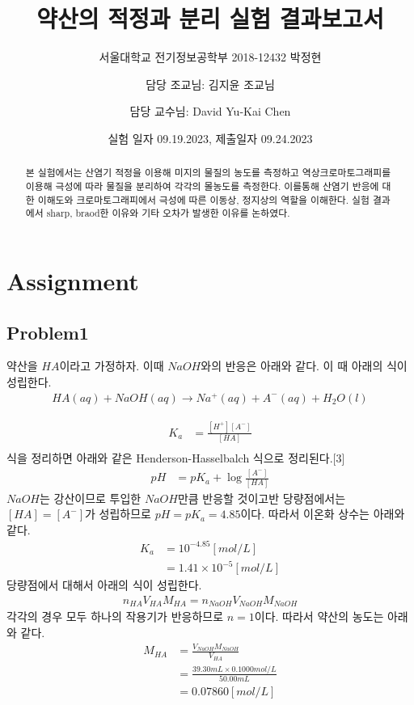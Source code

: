 \documentclass[%
 reprint,
 amsmath,amssymb,
 aps,
]{revtex4-2}
\begin{document}
\title{약산의 적정과 분리 실험 결과보고서}

\author{서울대학교 전기정보공학부 2018-12432 박정현}
\date{실험 일자 09.19.2023, 제출일자 09.24.2023}%
\author{담당 조교님: 김지윤 조교님}
\author{담당 교수님: David Yu-Kai Chen}

\begin{abstract}
본 실험에서는 산염기 적정을 이용해 미지의 물질의 농도를 측정하고 역상크로마토그래피를 이용해 극성에 따라 물질을 분리하여 각각의 몰농도를 측정한다. 이를통해 산염기 반응에 대한 이해도와 크로마토그래피에서 극성에 따른 이동상, 정지상의 역할을 이해한다. 실험 결과에서 sharp, braod한 이유와 기타 오차가 발생한 이유를 논하였다.
\end{abstract}

\maketitle


\section{\label{sec:level1}Assignment}
\subsection{\label{sec:level2}Problem1}
약산을 $HA$이라고 가정하자. 이때 $NaOH$와의 반응은 아래와 같다. 이 때 아래의 식이 성립한다.
\begin{align}
	HA(aq) + NaOH(aq) \rightarrow Na^{+}(aq) + A^{-}(aq) + H_{2}O(l)
\end{align}

\begin{align}
	K_{a} &= \frac{[H^{+}][A^{-}]}{[HA]}\\
\end{align}
식을 정리하면 아래와 같은 Henderson-Hasselbalch 식으로 정리된다.[3]
\begin{align}
	pH &= pK_{a} + \log \frac{[A^{-}]}{[HA]}
\end{align}
$NaOH$는 강산이므로 투입한 $NaOH$만큼 반응할 것이고반 당량점에서는  $[HA] = [A^{-}]$가 성립하므로 $pH = pK_{a} = 4.85$이다. 따라서 이온화 상수는 아래와 같다.
\begin{align}
	K_{a} &= 10^{-4.85}[mol/L]\\
	&=1.41 \times 10^{-5}[mol/L]
\end{align}
당량점에서 대해서 아래의 식이 성립한다.
\begin{align}
	n_{HA}V_{HA}M_{HA} = n_{NaOH}V_{NaOH}M_{NaOH}
\end{align}
각각의 경우 모두 하나의 작용기가 반응하므로 $n=1$이다. 따라서 약산의 농도는 아래와 같다.
\begin{align}
	M_{HA} &= \frac{V_{NaOH}M_{NaOH}}{V_{HA}}\\
	&=\frac{39.30mL \times 0.1000mol/L}{50.00mL}\\
	&= 0.07860 [mol/L]
\end{align}
\end{document}
